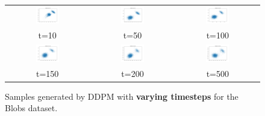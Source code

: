 \documentclass[11pt]{article}
\begin{document}
\begin{figure}[ht]
    \centering
    \begin{tabular}{ccc}
        \includegraphics[width=0.3\textwidth]{exps/ddpm_2_10_0.0001_0.02_blobs/samples_10.png} &
        \includegraphics[width=0.3\textwidth]{exps/ddpm_2_50_0.0001_0.02_blobs/samples_50.png} &
        \includegraphics[width=0.3\textwidth]{exps/ddpm_2_100_0.0001_0.02_blobs/samples_100.png} \\
        t=10 & t=50 & t=100 \\[0.5em]
        
        \includegraphics[width=0.3\textwidth]{exps/ddpm_2_150_0.0001_0.02_blobs/samples_150.png} &
        \includegraphics[width=0.3\textwidth]{exps/ddpm_2_200_0.0001_0.02_blobs/samples_200.png} &
        \includegraphics[width=0.3\textwidth]{exps/ddpm_2_500_0.0001_0.02_blobs/samples_500.png} \\
        t=150 & t=200 & t=500 \\
    \end{tabular}
    \caption{Samples generated by DDPM with \textbf{varying timesteps} for the Blobs dataset.}
    \label{fig:timesteps_blobs}
\end{figure}
\end{document}
